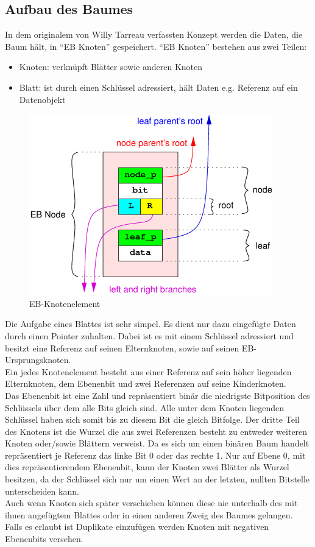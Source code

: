 \documentclass[a4paper,11pt,oneside,%
headsepline,												%
footsepline,												%
bibtotocnumbered									%
]{scrreprt}
\begin{document}
\subsection{Aufbau des Baumes}
In dem originalem von Willy Tarreau verfassten Konzept\autocite[Absatz Definitions]{Tarreau} werden die Daten, die Baum hält, in \enquote{EB Knoten}
gespeichert. \enquote{EB Knoten} bestehen aus zwei Teilen:
\begin{itemize}
\item Knoten: verknüpft Blätter sowie anderen Knoten
\item Blatt: ist durch einen Schlüssel adressiert, hält Daten e.g. Referenz auf ein Datenobjekt
\end{itemize}


\begin{figure}
  \begin{center}
    \includegraphics[width=.6\linewidth]{bilder/Ebnode.png}
  \end{center}
 \caption{EB-Knotenelement}
\end{figure}
Die Aufgabe eines Blattes ist sehr simpel. Es dient nur dazu eingefügte Daten durch einen Pointer zuhalten. Dabei ist es mit einem Schlüssel adressiert und besitzt eine Referenz auf seinen Elternknoten, sowie auf seinen EB-Ursprungsknoten.\\

Ein jedes Knotenelement besteht aus einer Referenz auf sein höher liegenden Elternknoten, dem Ebenenbit  und zwei Referenzen auf seine Kinderknoten. \\ Das Ebenenbit ist eine Zahl und repräsentiert binär die niedrigste Bitposition des Schlüssels über dem alle Bits gleich sind. Alle unter dem Knoten liegenden Schlüssel haben sich somit bis zu diesem Bit die gleich Bitfolge. Der dritte Teil des Knotens ist die Wurzel die aus zwei Referenzen besteht zu entweder weiteren Knoten oder/sowie Blättern verweist. Da es sich um einen binären Baum handelt repräsentiert je Referenz das linke Bit 0 oder das rechte 1. Nur auf Ebene 0, mit dies repräsentierendem Ebenenbit, kann der Knoten zwei Blätter als Wurzel besitzen, da der Schlüssel sich nur um einen Wert an der letzten, nullten Bitstelle unterscheiden kann.\\
Auch wenn Knoten sich später verschieben können diese nie unterhalb des mit ihnen angefügtem Blattes oder in einen anderen Zweig des Baumes gelangen. Falls es erlaubt ist Duplikate einzufügen werden  Knoten mit negativen Ebenenbits versehen.\\
\end{document}
